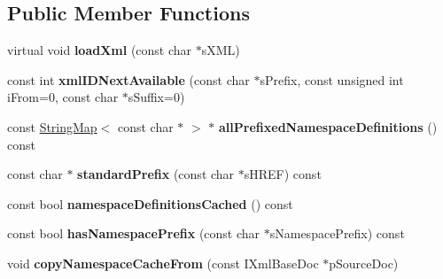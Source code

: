 \subsection*{\-Public \-Member \-Functions}
\begin{DoxyCompactItemize}
\item 
\hypertarget{classgeneral__server_1_1XmlBaseDoc_a19d0b5fe8d994ae275623468423e9c86}{virtual void {\bfseries load\-Xml} (const char $\ast$s\-X\-M\-L)}\label{classgeneral__server_1_1XmlBaseDoc_a19d0b5fe8d994ae275623468423e9c86}

\item 
\hypertarget{classgeneral__server_1_1XmlBaseDoc_a73533c6173d28a7266bee134ec880496}{const int {\bfseries xml\-I\-D\-Next\-Available} (const char $\ast$s\-Prefix, const unsigned int i\-From=0, const char $\ast$s\-Suffix=0)}\label{classgeneral__server_1_1XmlBaseDoc_a73533c6173d28a7266bee134ec880496}

\item 
\hypertarget{classgeneral__server_1_1XmlBaseDoc_a14aebcccb18a8a3dfa9af268159968b6}{const \hyperlink{classgeneral__server_1_1StringMap}{\-String\-Map}$<$ const char $\ast$ $>$ $\ast$ {\bfseries all\-Prefixed\-Namespace\-Definitions} () const }\label{classgeneral__server_1_1XmlBaseDoc_a14aebcccb18a8a3dfa9af268159968b6}

\item 
\hypertarget{classgeneral__server_1_1XmlBaseDoc_a898d1d73d0e9850ff5fbfbcab5217fdd}{const char $\ast$ {\bfseries standard\-Prefix} (const char $\ast$s\-H\-R\-E\-F) const }\label{classgeneral__server_1_1XmlBaseDoc_a898d1d73d0e9850ff5fbfbcab5217fdd}

\item 
\hypertarget{classgeneral__server_1_1XmlBaseDoc_a4949ec54dc5fe80631203eab2e6fa652}{const bool {\bfseries namespace\-Definitions\-Cached} () const }\label{classgeneral__server_1_1XmlBaseDoc_a4949ec54dc5fe80631203eab2e6fa652}

\item 
\hypertarget{classgeneral__server_1_1XmlBaseDoc_a0e96715abe22c7af9232981d0c4fb16b}{const bool {\bfseries has\-Namespace\-Prefix} (const char $\ast$s\-Namespace\-Prefix) const }\label{classgeneral__server_1_1XmlBaseDoc_a0e96715abe22c7af9232981d0c4fb16b}

\item 
\hypertarget{classgeneral__server_1_1XmlBaseDoc_a72a4d8309a7492f869c5e78f4d7e4800}{void {\bfseries copy\-Namespace\-Cache\-From} (const \-I\-Xml\-Base\-Doc $\ast$p\-Source\-Doc)}\label{classgeneral__server_1_1XmlBaseDoc_a72a4d8309a7492f869c5e78f4d7e4800}


\end{DoxyCompactItemize}
